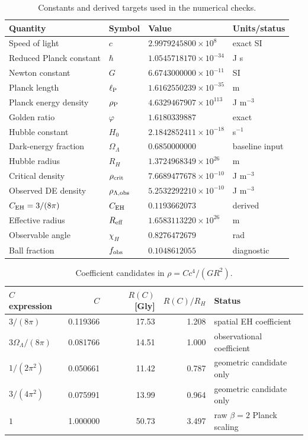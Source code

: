 \documentclass[11pt,a4paper]{article}
\newcommand{\vph}{\varphi}
\newcommand{\ellP}{\ell_{\rm P}}
\newcommand{\rhoP}{\rho_{\rm P}}
\newcommand{\rhoL}{\rho_{\Lambda,{\rm obs}}}
\newcommand{\rhoC}{\rho_{\rm crit}}
\newcommand{\RH}{R_H}
\newcommand{\Reff}{R_{\rm eff}}
\newcommand{\OmL}{\Omega_\Lambda}
\newcommand{\CEH}{C_{\rm EH}}
\begin{document}
\begin{table}[htbp]
\centering
\caption{Constants and derived targets used in the numerical checks.}
\label{tab:const}
\small
\begin{tabular}{@{}llll@{}}
\toprule
Quantity & Symbol & Value & Units/status \\
\midrule
Speed of light & $c$ & $2.9979245800\times10^8$ & exact SI \\
Reduced Planck constant & $\hbar$ & $1.0545718170\times10^{-34}$ & J s \\
Newton constant & $G$ & $6.6743000000\times10^{-11}$ & SI \\
Planck length & $\ellP$ & $1.6162550239\times10^{-35}$ & m \\
Planck energy density & $\rhoP$ & $4.6329467907\times10^{113}$ & J m$^{-3}$ \\
Golden ratio & $\vph$ & $1.6180339887$ & exact \\
Hubble constant & $H_0$ & $2.1842852411\times10^{-18}$ & s$^{-1}$ \\
Dark-energy fraction & $\OmL$ & $0.6850000000$ & baseline input \\
Hubble radius & $\RH$ & $1.3724968349\times10^{26}$ & m \\
Critical density & $\rhoC$ & $7.6689477678\times10^{-10}$ & J m$^{-3}$ \\
Observed DE density & $\rhoL$ & $5.2532292210\times10^{-10}$ & J m$^{-3}$ \\
$\CEH=3/(8\pi)$ & $\CEH$ & $0.1193662073$ & derived \\
Effective radius & $\Reff$ & $1.6583113220\times10^{26}$ & m \\
Observable angle & $\chi_H$ & $0.8276472679$ & rad \\
Ball fraction & $f_{\rm obs}$ & $0.1048612055$ & diagnostic \\
\bottomrule
\end{tabular}
\end{table}

\begin{table}[htbp]
\centering
\caption{Coefficient candidates in $\rho=Cc^4/(GR^2)$.}
\label{tab:coeff}
\small
\begin{tabular}{@{}lrrrl@{}}
\toprule
$C$ expression & $C$ & $R(C)$ [Gly] & $R(C)/\RH$ & Status \\
\midrule
$3/(8\pi)$ & 0.119366 & 17.53 & 1.208 & spatial EH coefficient \\
$3\OmL/(8\pi)$ & 0.081766 & 14.51 & 1.000 & observational coefficient \\
$1/(2\pi^2)$ & 0.050661 & 11.42 & 0.787 & geometric candidate only \\
$3/(4\pi^2)$ & 0.075991 & 13.99 & 0.964 & geometric candidate only \\
$1$ & 1.000000 & 50.73 & 3.497 & raw $\beta=2$ Planck scaling \\
\bottomrule
\end{tabular}
\end{table}
\end{document}
